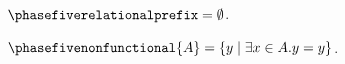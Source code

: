 \begin{definition}\label{phase5_relational_prefix}
    $\phasefiverelationalprefix = \emptyset$.
\end{definition}

\begin{definition}\label{phase5_relational_nonfunctional}
    $\phasefivenonfunctional{A} = \{ y \mid \exists x\in A. y = y \}$.
\end{definition}
